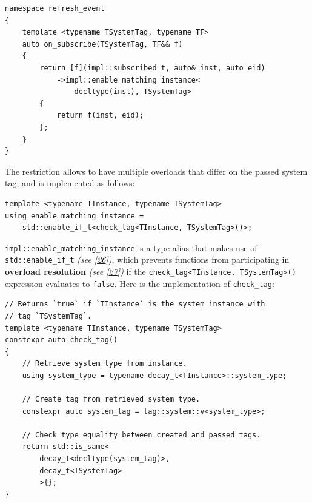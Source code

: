 \documentclass[twoside, 12pt, a4paper, openany]{book}
\begin{document}
\begin{verbatim}
namespace refresh_event
{
    template <typename TSystemTag, typename TF>
    auto on_subscribe(TSystemTag, TF&& f)
    {
        return [f](impl::subscribed_t, auto& inst, auto eid)
            ->impl::enable_matching_instance<
                decltype(inst), TSystemTag>
        {
            return f(inst, eid);
        };
    }
}
\end{verbatim}

The restriction allows to have multiple overloads that differ on the
passed system tag, and is implemented as follows:

\begin{verbatim}
template <typename TInstance, typename TSystemTag>
using enable_matching_instance =
    std::enable_if_t<check_tag<TInstance, TSystemTag>()>;
\end{verbatim}

\texttt{impl::enable_matching_instance}
is a type alias that makes use of
\texttt{std::enable_if_t}
\emph{(see {[}\protect\hyperlink{ref-cppreference_enable_if}{26}{]})},
which prevents functions from participating in \textbf{overload
resolution} \emph{(see
{[}\protect\hyperlink{ref-cppreference_overload_resolution}{27}{]})} if
the
\texttt{check_tag<TInstance, TSystemTag>()}
expression evaluates to
\texttt{false}.
Here is the implementation of
\texttt{check_tag}:

\begin{verbatim}
// Returns `true` if `TInstance` is the system instance with
// tag `TSystemTag`.
template <typename TInstance, typename TSystemTag>
constexpr auto check_tag()
{
    // Retrieve system type from instance.
    using system_type = typename decay_t<TInstance>::system_type;

    // Create tag from retrieved system type.
    constexpr auto system_tag = tag::system::v<system_type>;

    // Check type equality between created and passed tags.
    return std::is_same<
        decay_t<decltype(system_tag)>,
        decay_t<TSystemTag>
        >{};
}
\end{verbatim}
\end{document}
